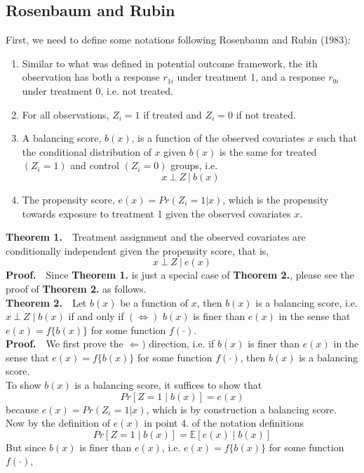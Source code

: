 \documentclass[12pt]{article}
\begin{document}
\subsection{Rosenbaum and Rubin} \label{RR}
First, we need to define some notations following Rosenbaum and Rubin (1983): 
\begin{enumerate}
      \item Similar to what was defined in potential outcome framework, the ith observation has both a response $r_{1i}$ under treatment 1, and a response $r_{0i}$ under treatment 0, i.e. not treated.
      \item For all observations, $Z_i = 1$ if treated and $Z_i = 0$ if not treated.
      \item A balancing score, $b(x)$, is a function of the observed covariates $x$ such that the conditional distribution of $x$ given $b(x)$ is the same for treated $(Z_i = 1)$ and control $(Z_i = 0)$ groups, i.e. 
            $$x\ \bot\ Z\ |\ b(x)$$
      \item The propensity score, $e(x) = Pr(Z_i = 1|x)$, which is the propensity towards exposure to treatment 1 given the observed covariates $x$.
\end{enumerate}
\textbf{Theorem 1.}\ \ Treatment assignment and the observed covariates are conditionally independent given the propensity score, that is, 
$$x\ \bot\ Z\ |\ e(x)$$
\textbf{Proof.}\ \ Since \textbf{Theorem 1.} is just a special case of \textbf{Theorem 2.}, please see the proof of \textbf{Theorem 2.} as follows. \\ 
\textbf{Theorem 2.}\ \ Let $b(x)$ be a function of $x$, then $b(x)$ is a balancing score, i.e. $x\ \bot\ Z \mid b(x)$ if and only if $(\Longleftrightarrow)$ $b(x)$ is finer than $e(x)$ in the sense that $e(x) = f\{b(x)\}$ for some function $f(\cdot)$. \\ 
\textbf{Proof.}\ \ We first prove the $\Leftarrow)$ direction, i.e. if $b(x)$ is finer than $e(x)$ in the sense that $e(x) = f\{b(x)\}$ for some function $f(\cdot)$, then $b(x)$ is a balancing score. \\ 
To show $b(x)$ is a balancing score, it suffices to show that 
\begin{equation}
Pr[Z = 1 \mid b(x)] = e(x)
\end{equation}
because $e(x) = Pr(Z_i = 1|x)$, which is by construction a balancing score. \\ 
Now by the definition of $e(x)$ in point 4. of the notation definitions
$$Pr[Z = 1 \mid b(x)] = \mathbb{E} [e(x) \mid b(x)]$$
But since $b(x)$ is finer than $e(x)$, i.e. $e(x) = f\{b(x)\}$ for some function $f(\cdot)$,
\end{document}
